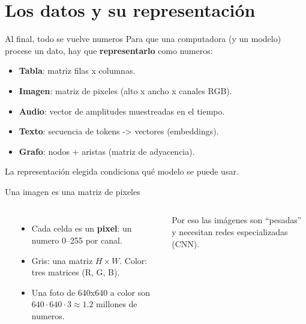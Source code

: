 \documentclass[aspectratio=169]{beamer}
\begin{document}
\section{Los datos y su representaci\'on}

\begin{frame}{Al final, todo se vuelve numeros}
  Para que una computadora (y un modelo) procese un dato, hay que
  \textbf{representarlo} como numeros:
  \begin{itemize}
    \item \textbf{Tabla}: matriz filas x columnas.
    \item \textbf{Imagen}: matriz de pixeles (alto x ancho x canales RGB).
    \item \textbf{Audio}: vector de amplitudes muestreadas en el tiempo.
    \item \textbf{Texto}: secuencia de tokens -> vectores (embeddings).
    \item \textbf{Grafo}: nodos + aristas (matriz de adyacencia).
  \end{itemize}
  La representaci\'on elegida condiciona qu\'e modelo se puede usar.
\end{frame}

\begin{frame}[fragile]{Una imagen es una matriz de pixeles}
  \begin{columns}[c]
    \begin{center}
    \end{center}
      \begin{itemize}
        \item Cada celda es un \textbf{pixel}: un numero 0--255 por canal.
        \item Gris: una matriz $H\times W$. Color: tres matrices (R, G, B).
        \item Una foto de 640x640 a color son
              $640\cdot640\cdot3 \approx 1.2$ millones de numeros.
      \end{itemize}
      Por eso las im\'agenes son ``pesadas'' y necesitan redes especializadas
      (CNN).
  \end{columns}
\end{frame}
\end{document}
